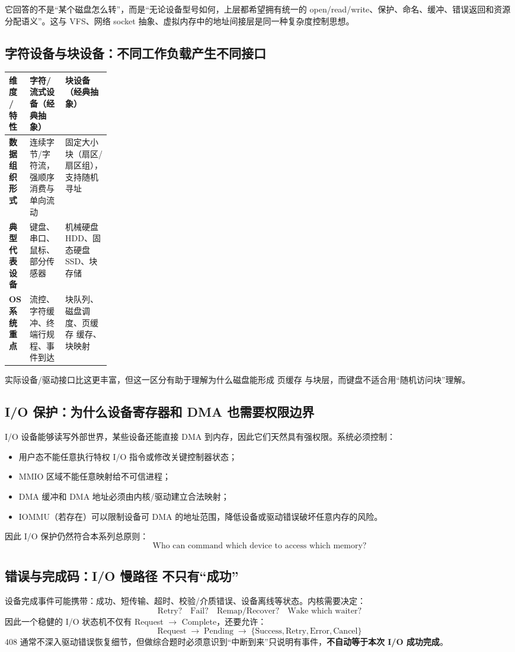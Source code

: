 \documentclass[11pt,a4paper]{ctexart}
\newcommand{\kw}[1]{\textbf{#1}}
\newcommand{\arr}{\;\longrightarrow\;}
\begin{document}
\begin{exam}
它回答的不是“某个磁盘怎么转”，而是“无论设备型号如何，上层都希望拥有统一的 open/read/write、保护、命名、缓冲、错误返回和资源分配语义”。这与 VFS、网络 socket 抽象、虚拟内存中的地址间接层是同一种复杂度控制思想。
\end{exam}

\subsection{字符设备与块设备：不同工作负载产生不同接口}
\begingroup
\small
\renewcommand{\arraystretch}{1.25}
\setlength{\tabcolsep}{6pt}
\begin{tabularx}{\linewidth}{>{\bfseries}p{0.2\linewidth} X X}
\toprule
维度 / 特性 & 字符/流式设备（经典抽象） & 块设备（经典抽象） \\
\midrule
数据组织形式 & 连续字节/字符流，强顺序消费与单向流动 & 固定大小块（扇区/扇区组），支持随机寻址 \\
典型代表设备 & 键盘、串口、鼠标、部分传感器 & 机械硬盘 HDD、固态硬盘 SSD、块存储 \\
OS 系统重点 & 流控、字符缓冲、终端行规程、事件到达 & 块队列、磁盘调度、页缓存 缓存、块映射 \\
\bottomrule
\end{tabularx}
\endgroup
实际设备/驱动接口比这更丰富，但这一区分有助于理解为什么磁盘能形成 页缓存 与块层，而键盘不适合用“随机访问块”理解。

\subsection{I/O 保护：为什么设备寄存器和 DMA 也需要权限边界}
I/O 设备能够读写外部世界，某些设备还能直接 DMA 到内存，因此它们天然具有强权限。系统必须控制：
\begin{itemize}
  \item 用户态不能任意执行特权 I/O 指令或修改关键控制器状态；
  \item MMIO 区域不能任意映射给不可信进程；
  \item DMA 缓冲和 DMA 地址必须由内核/驱动建立合法映射；
  \item IOMMU（若存在）可以限制设备可 DMA 的地址范围，降低设备或驱动错误破坏任意内存的风险。
\end{itemize}
因此 I/O 保护仍然符合本系列总原则：
\[
\boxed{\text{Who can command which device to access which memory?}}
\]

\subsection{错误与完成码：I/O 慢路径 不只有“成功”}
设备完成事件可能携带：成功、短传输、超时、校验/介质错误、设备离线等状态。内核需要决定：
\[
\text{Retry?}\quad\text{Fail?}\quad\text{Remap/Recover?}\quad\text{Wake which waiter?}
\]
因此一个稳健的 I/O 状态机不仅有 Request $\to$ Complete，还要允许：
\[
\boxed{\text{Request}\arr\text{Pending}\arr\{\text{Success},\text{Retry},\text{Error},\text{Cancel}\}}
\]
408 通常不深入驱动错误恢复细节，但做综合题时必须意识到“中断到来”只说明有事件，\kw{不自动等于本次 I/O 成功完成}。
\end{document}
